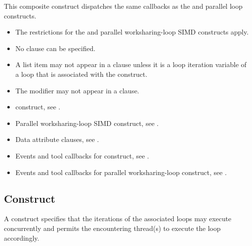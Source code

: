 \tools

This composite construct dispatches the same callbacks as the  and parallel loop constructs.

\restrictions
\begin{itemize}
\item The restrictions for the  and parallel worksharing-loop SIMD constructs apply.
\item No  clause can be specified.
\item A list item may not appear in a  clause unless it is a
loop iteration variable of a loop that is associated with the construct.
\item The  modifier may not appear in a  clause.
\end{itemize}

\crossreferences
\begin{itemize}
\item {} construct, see
.

\item Parallel worksharing-loop SIMD construct, see
.

\item Data attribute clauses, see .

\item Events and tool callbacks for  construct, see
.

\item Events and tool callbacks for parallel worksharing-loop construct, see
.

\end{itemize}


\subsection{ Construct}
\label{subsec:loop Construct}
\summary
  A  construct specifies that the iterations of the associated
  loops may execute concurrently and permits the encountering thread(s) to
  execute the loop accordingly.

